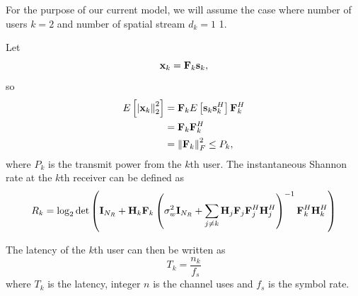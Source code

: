 \documentclass[a4paper, 12pt, onecolumn, journal, twoside, draftclsnofoot]{IEEEtran}
\begin{document}
For the purpose of our current model, we will assume the case where number of users $k = 2$ and number of spatial stream $d_k =1$ 1.

Let 
\begin{equation*}
	{\bf x}_k = {\bf F}_k {\bf s}_k,
\end{equation*}
so
\begin{align*}
	E \left[ \left| {\bf x}_k \right\|_2^2 \right] &= {\bf F}_k E \left[ {\bf s}_k {\bf s}_k^H \right] {\bf F}_k^H \\
	&= {\bf F}_k {\bf F}_k^H  \\
	&=  \left\| {\bf F}_k \right\|_F^2  \leq P_k,
\end{align*}
where $P_k$ is the transmit power from the $k$th user.  The instantaneous Shannon rate at the $k$th receiver can be defined as 
\begin{equation*}
	R_{k} =  \log_2 \det \left(  {\bf I}_{N_R}  +  {\bf H}_k {\bf F}_k     \left(  \sigma_w^2 {\bf I}_{N_R}  + \sum_{j \neq k}  {\bf H}_j {\bf F}_j {\bf F}_j^H {\bf H}_j^H  \right)^{-1}     {\bf F}_k^H {\bf H}_k^H  \right) 
\end{equation*}

The latency of the $k$th user can then be written as
\begin{equation*}
    T_{k} = \frac{n_k}{f_s}
\end{equation*}
where $T_{k}$ is the latency, integer $n$ is the channel uses and $f_s$ is the symbol rate. \\
\end{document}
